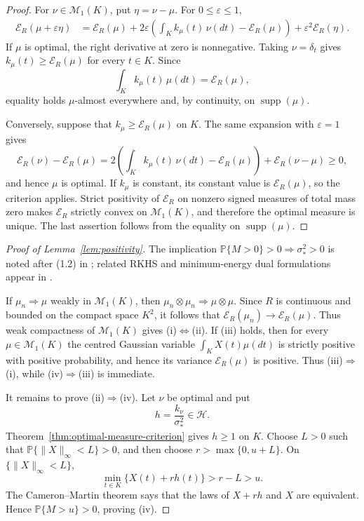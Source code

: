 \documentclass[11pt]{amsart}
\theoremstyle{definition}
\theoremstyle{remark}
\providecommand{\supp}{\operatorname{supp}}
\newcommand{\Pp}{\mathbb P}
\newcommand{\cH}{\mathcal H}
\newcommand{\cM}{\mathcal M_1}
\begin{document}
\begin{proof}
For \(\nu\in\cM(K)\), put \(\eta=\nu-\mu\).  For
\(0\leq\varepsilon\leq1\),
\begin{align*}
 \mathcal E_R(\mu+\varepsilon\eta)
 &=\mathcal E_R(\mu)
   +2\varepsilon\left(\int_Kk_\mu(t)\,\nu(dt)
                         -\mathcal E_R(\mu)\right)
   +\varepsilon^2\mathcal E_R(\eta).
\end{align*}
If \(\mu\) is optimal, the right derivative at zero is nonnegative.
Taking \(\nu=\delta_t\) gives
\(k_\mu(t)\geq\mathcal E_R(\mu)\) for every \(t\in K\).  Since
\[
 \int_Kk_\mu(t)\,\mu(dt)=\mathcal E_R(\mu),
\]
equality holds \(\mu\)-almost everywhere and, by continuity, on
\(\supp(\mu)\).

Conversely, suppose that
\(k_\mu\geq\mathcal E_R(\mu)\) on \(K\).  The same expansion with
\(\varepsilon=1\) gives
\[
 \mathcal E_R(\nu)-\mathcal E_R(\mu)
 =2\left(\int_Kk_\mu(t)\,\nu(dt)-\mathcal E_R(\mu)\right)
   +\mathcal E_R(\nu-\mu)\geq0,
\]
and hence \(\mu\) is optimal.  If \(k_\mu\) is constant, its constant
value is \(\mathcal E_R(\mu)\), so the criterion applies.  Strict positivity
of \(\mathcal E_R\) on nonzero signed measures of total mass zero makes
\(\mathcal E_R\) strictly convex on \(\cM(K)\), and therefore the
optimal measure is unique.  The last assertion follows from the equality
on \(\supp(\mu)\).
\end{proof}

\begin{proof}[Proof of Lemma~\ref{lem:positivity}]
The implication $\Pp\{M>0\}>0\Rightarrow\sigma_*^2>0$ is noted after
(1.2) in \cite{wu2019high}; related RKHS and minimum-energy dual
formulations appear in \cite[Theorem~5.1]{adler2014existence}.

If $\mu_n\Rightarrow\mu$ weakly in $\cM(K)$, then
$\mu_n\otimes\mu_n\Rightarrow\mu\otimes\mu$.  Since $R$ is continuous
and bounded on the compact space $K^2$, it follows that
$\mathcal E_R(\mu_n)\to\mathcal E_R(\mu)$.  Thus weak compactness of
$\cM(K)$ gives (i)$\Leftrightarrow$(ii).  If (iii) holds, then for every
$\mu\in\cM(K)$ the centred Gaussian variable
$\int_KX(t)\mu(dt)$ is strictly positive with positive probability,
and hence its variance $\mathcal E_R(\mu)$ is positive.  Thus
(iii)$\Rightarrow$(i), while (iv)$\Rightarrow$(iii) is immediate.

It remains to prove (ii)$\Rightarrow$(iv).  Let $\nu$ be optimal and put
\[
 h=\frac{k_\nu}{\sigma_*^2}\in\cH.
\]
Theorem~\ref{thm:optimal-measure-criterion} gives $h\geq1$ on $K$.
Choose $L>0$ such that $\Pp\{\|X\|_\infty<L\}>0$, and then choose
$r>\max\{0,u+L\}$.  On $\{\|X\|_\infty<L\}$,
\[
 \min_{t\in K}\{X(t)+rh(t)\}>r-L>u.
\]
The Cameron--Martin theorem says that the laws of $X+rh$ and $X$ are
equivalent.  Hence $\Pp\{M>u\}>0$, proving (iv).
\end{proof}
\end{document}
